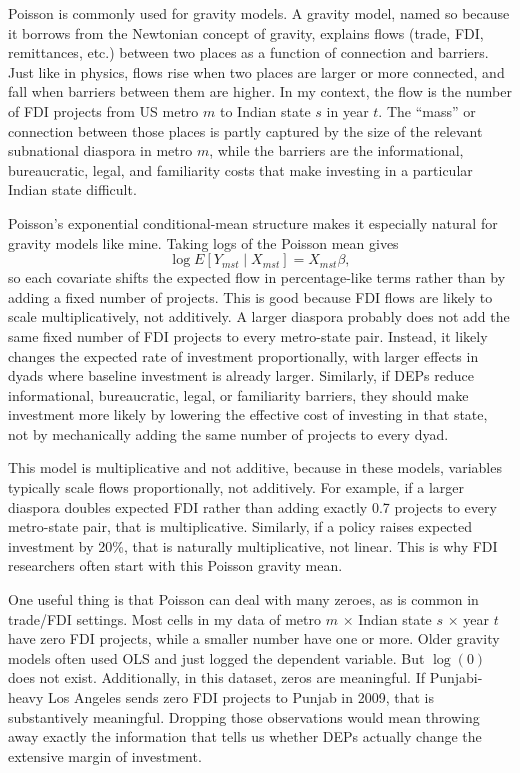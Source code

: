 \documentclass[doublespace,nopageskip]{UVAthesis}
\begin{document}
Poisson is commonly used for gravity models. A gravity model, named so because it borrows from the Newtonian concept of gravity, explains flows (trade, FDI,  remittances, etc.) between two places as a function of connection and barriers. Just like in physics, flows rise when two places are larger or more connected, and fall  when barriers between them are higher.   In my context, the flow is the number of FDI projects from US metro $m$ to Indian state $s$ in year $t$. The ``mass'' or connection between those places is partly captured by the size of the relevant subnational diaspora in metro $m$, while the barriers are the informational, bureaucratic, legal, and familiarity costs that make investing in a particular Indian state difficult.

Poisson's exponential conditional-mean structure makes it especially natural for gravity models like mine. Taking logs of the Poisson mean gives
\[
\log E[Y_{mst} \mid X_{mst}] = X_{mst}\beta,
\]
so each covariate shifts the expected flow in percentage-like terms rather than by adding a fixed number of projects. This is good because FDI flows are likely to scale multiplicatively, not additively. A larger diaspora probably does not add the same fixed number of FDI projects to every metro-state pair. Instead, it likely changes the expected rate of investment proportionally, with larger effects in dyads where baseline investment is already larger. Similarly, if DEPs reduce informational, bureaucratic, legal, or familiarity barriers, they should make investment more likely by lowering the effective cost of investing in that state, not by mechanically adding the same number of projects to every dyad.

    This model is multiplicative and not additive, because in these models, variables typically scale flows proportionally, not additively. For example, if a larger diaspora doubles expected FDI rather than adding exactly 0.7 projects to every metro-state pair, that is multiplicative. Similarly, if a policy raises expected investment by 20\%, that is naturally multiplicative, not linear. This is why FDI researchers often start with this Poisson gravity mean.

    One useful thing is that Poisson can deal with many zeroes, as is common in trade/FDI settings. Most cells in my data of metro $m$ $\times$ Indian state $s$ $\times$ year $t$ have zero FDI projects, while a smaller number have one or more. Older gravity models often used OLS and just logged the dependent variable. But $\log(0)$ does not exist. Additionally, in this dataset, zeros are meaningful. If Punjabi-heavy Los Angeles sends zero FDI projects to Punjab in 2009, that is substantively meaningful. Dropping those observations would mean throwing away exactly the information that tells us whether DEPs actually change the extensive margin of investment.
\end{document}
